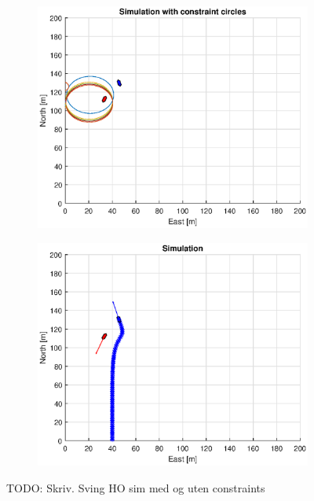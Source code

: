 \begin{figure}[ht]
\begin{subfigure}[b]{0.499\textwidth}
    \end{subfigure}
    \hfill
    \\
    \begin{subfigure}[b]{0.49\textwidth}
        \centering
        \includegraphics[width=\textwidth]{Images/Figures/sving_HO/Simple0_f1_Frame5}
    \end{subfigure}
    \hfill
    \begin{subfigure}[b]{0.499\textwidth}
        \centering
        \includegraphics[width=\textwidth]{Images/Figures/sving_HO/Simple0_f600_Frame5}
    \end{subfigure}
    \hfill
    \caption{TODO: Skriv. Sving HO sim med og uten constraints}
\end{figure}


